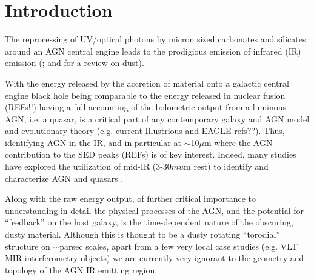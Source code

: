 \documentclass{emulateapj}
\begin{document}
\maketitle


\section{Introduction}
The reprocessing of UV/optical photons by micron sized carbonates and
silicates around an AGN central engine leads to the prodigious emission
of infrared (IR) emission (\citet[See][for review on AGN infrared
emission]{Elitzur14}; \citet[][for a review on the Unified Model of
Active Galactic Nuclei]{Netzer15} and \citet[][]{Draine03} for a
review on dust).

With the energy released by the accretion of material onto a galactic
central engine black hole being comparable to the energy released in
nuclear fusion (REFs!!) having a full accounting of the bolometric
output from a luminous AGN, i.e. a quasar, is a critical part of any
contemporary galaxy and AGN model and evolutionary theory (e.g. current
Illustrious and EAGLE refs??). Thus, identifying AGN in the IR, and in
particular at $\sim$10$\mu$m where the AGN contribution to the SED
peaks (REFs) is of key interest. Indeed, many studies have explored
the utilization of mid-IR (3-30$mu$m rest) to identify and characterize
AGN and quasars \citep{Lacy04, Stern05, Martinez-Sansigre06,
Richards09b, Donley12, Stern12, Banerji13, Assef13, Richards15,
Timlin16}. 

Along with the raw energy output, of further critical importance to
understanding in detail the physical processes of the AGN, and the
potential for ``feedback'' on the host galaxy, is the time-dependent
nature of the obscuring, dusty material. Although this is thought to
be a dusty rotating ``torodial'' structure on $\sim$parsec scales,
apart from a few very local case studies (e.g. VLT MIR interferometry
objects) we are currently very ignorant to the geometry and topology
of the AGN IR emitting region.
\end{document}
